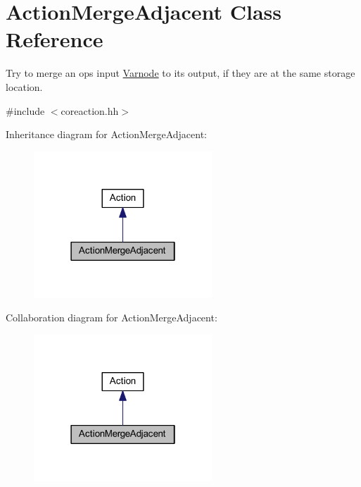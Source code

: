 \hypertarget{class_action_merge_adjacent}{}\section{Action\+Merge\+Adjacent Class Reference}
\label{class_action_merge_adjacent}


Try to merge an op\textquotesingle{}s input \mbox{\hyperlink{class_varnode}{Varnode}} to its output, if they are at the same storage location.  




{\ttfamily \#include $<$coreaction.\+hh$>$}



Inheritance diagram for Action\+Merge\+Adjacent\+:
\nopagebreak
\begin{figure}[H]
\begin{center}
\leavevmode
\includegraphics[width=190pt]{class_action_merge_adjacent__inherit__graph}
\end{center}
\end{figure}


Collaboration diagram for Action\+Merge\+Adjacent\+:
\nopagebreak
\begin{figure}[H]
\begin{center}
\leavevmode
\includegraphics[width=190pt]{class_action_merge_adjacent__coll__graph}
\end{center}
\end{figure}
